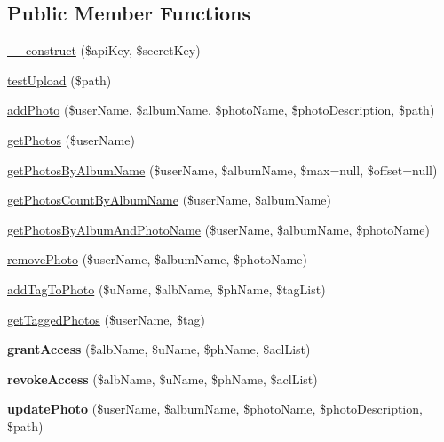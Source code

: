 \subsection*{Public Member Functions}
\begin{DoxyCompactItemize}
\item 
\hyperlink{class_photo_service_a49f2ad222e06420736d750e167d55d7c}{\+\_\+\+\_\+construct} (\$api\+Key, \$secret\+Key)
\item 
\hyperlink{class_photo_service_a8a07d23179918d6b8d0b099f63655a3f}{test\+Upload} (\$path)
\item 
\hyperlink{class_photo_service_af298d9c0d41a5607a7c560f241ccc62c}{add\+Photo} (\$user\+Name, \$album\+Name, \$photo\+Name, \$photo\+Description, \$path)
\item 
\hyperlink{class_photo_service_a7af684ea27b137191d83df37e317c73b}{get\+Photos} (\$user\+Name)
\item 
\hyperlink{class_photo_service_a5e4761b9875214c545b18a8134a14dab}{get\+Photos\+By\+Album\+Name} (\$user\+Name, \$album\+Name, \$max=null, \$offset=null)
\item 
\hyperlink{class_photo_service_ad5525c645fb34fc0dbfdacefa8af47cd}{get\+Photos\+Count\+By\+Album\+Name} (\$user\+Name, \$album\+Name)
\item 
\hyperlink{class_photo_service_adf416b4820fa640627410af1568dda58}{get\+Photos\+By\+Album\+And\+Photo\+Name} (\$user\+Name, \$album\+Name, \$photo\+Name)
\item 
\hyperlink{class_photo_service_a9d373e523a08e26a1a8b8c3fbcebc589}{remove\+Photo} (\$user\+Name, \$album\+Name, \$photo\+Name)
\item 
\hyperlink{class_photo_service_a4fdde5fc13818dd5fdc9fff40cf7ce7d}{add\+Tag\+To\+Photo} (\$u\+Name, \$alb\+Name, \$ph\+Name, \$tag\+List)
\item 
\hyperlink{class_photo_service_a1a846eba4e5ed2538e475b246b61773e}{get\+Tagged\+Photos} (\$user\+Name, \$tag)
\item 
\hypertarget{class_photo_service_a5e0061ea551d1e53dad1bf1e2d2712aa}{{\bfseries grant\+Access} (\$alb\+Name, \$u\+Name, \$ph\+Name, \$acl\+List)}\label{class_photo_service_a5e0061ea551d1e53dad1bf1e2d2712aa}

\item 
\hypertarget{class_photo_service_a50fb8abd1a80d7fc4344d042debba9de}{{\bfseries revoke\+Access} (\$alb\+Name, \$u\+Name, \$ph\+Name, \$acl\+List)}\label{class_photo_service_a50fb8abd1a80d7fc4344d042debba9de}

\item 
\hypertarget{class_photo_service_a8f0cb94e86eb7912b7ad1ba23cf1751d}{{\bfseries update\+Photo} (\$user\+Name, \$album\+Name, \$photo\+Name, \$photo\+Description, \$path)}\label{class_photo_service_a8f0cb94e86eb7912b7ad1ba23cf1751d}

\end{DoxyCompactItemize}
